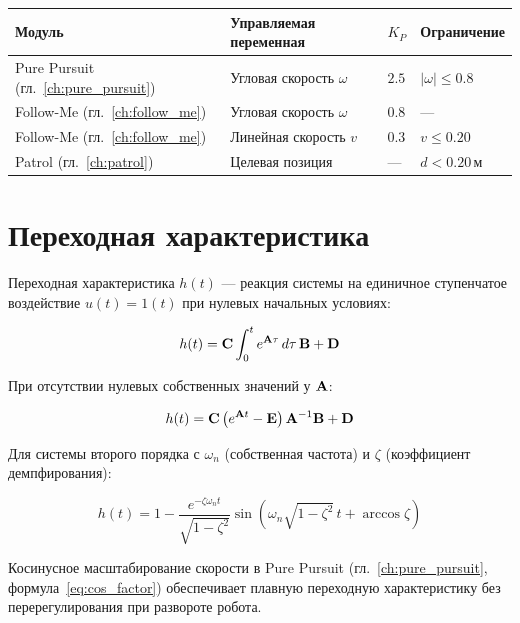 \begin{center}
\begin{tabular}{llll}
\toprule
\textbf{Модуль} & \textbf{Управляемая переменная} & $K_P$ & \textbf{Ограничение}\\
\midrule
Pure Pursuit (гл.~\ref{ch:pure_pursuit}) & Угловая скорость $\omega$ & $2.5$ & $|\omega| \leq 0.8$\\
Follow-Me (гл.~\ref{ch:follow_me}) & Угловая скорость $\omega$ & $0.8$ & ---\\
Follow-Me (гл.~\ref{ch:follow_me}) & Линейная скорость $v$ & $0.3$ & $v \leq 0.20$\\
Patrol (гл.~\ref{ch:patrol}) & Целевая позиция & --- & $d < 0.20\,\text{м}$\\
\bottomrule
\end{tabular}
\end{center}

\section{Переходная характеристика}
\label{sec:transient}

Переходная характеристика $h(t)$ --- реакция системы на единичное
ступенчатое воздействие $u(t) = 1(t)$ при нулевых начальных условиях:

\begin{equation}
  h(t) = \mathbf{C}\int_0^t e^{\mathbf{A}\tau}\,d\tau\,\mathbf{B} + \mathbf{D}
  \label{eq:step_response}
\end{equation}

При отсутствии нулевых собственных значений у $\mathbf{A}$:

\begin{equation}
  h(t) = \mathbf{C}\left(e^{\mathbf{A}t} - \mathbf{E}\right)\mathbf{A}^{-1}\mathbf{B} + \mathbf{D}
  \label{eq:step_response2}
\end{equation}

Для системы второго порядка с $\omega_n$ (собственная частота)
и $\zeta$ (коэффициент демпфирования):

\begin{equation}
  h(t) = 1 - \frac{e^{-\zeta\omega_n t}}{\sqrt{1-\zeta^2}}
  \sin\!\left(\omega_n\sqrt{1-\zeta^2}\,t + \arccos\zeta\right)
  \label{eq:2nd_order_response}
\end{equation}

\begin{notebox}
Косинусное масштабирование скорости в Pure Pursuit
(гл.~\ref{ch:pure_pursuit}, формула~\eqref{eq:cos_factor})
обеспечивает плавную переходную характеристику без перерегулирования
при развороте робота.
\end{notebox}

